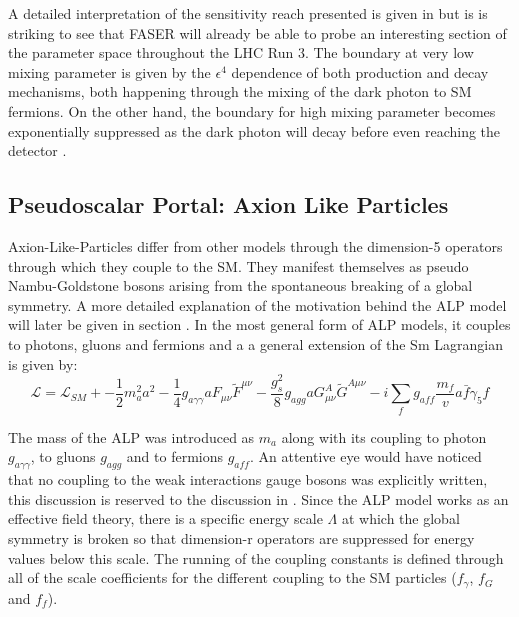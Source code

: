 		A detailed interpretation of the sensitivity reach presented is given in \cite{FASER_LLP} but is is striking to see that FASER will already be able to probe an interesting section of the parameter space throughout the LHC Run 3. The boundary at very low mixing parameter is given by the $\epsilon^4$ dependence of both production and decay mechanisms, both happening through the mixing of the dark photon to SM fermions. On the other hand, the boundary for high mixing parameter becomes exponentially suppressed as the dark photon will decay before even reaching the detector \cite{FASER_LLP}.  
		
		
		\subsection{Pseudoscalar Portal: Axion Like Particles}
		
		Axion-Like-Particles differ from other models through the dimension-5 operators through which they couple to the SM. They manifest themselves as pseudo Nambu-Goldstone bosons arising from the spontaneous breaking of a global symmetry. A more detailed explanation of the motivation behind the ALP model will later be given in section . In the most general form of ALP models, it couples to photons, gluons and fermions and a a general extension of the Sm Lagrangian is given by: 
		\begin{equation}
			\mathcal{L} = \mathcal{L}_{SM} + -\frac{1}{2} m_a^2 a^2 - \frac{1}{4} g_{a\gamma\gamma} a F_{\mu\nu} \tilde{F}^{\mu\nu} - \frac{g_s^2}{8} g_{agg} a G_{\mu\nu}^A \tilde{G}^{A\mu\nu} - i \sum_f g_{aff} \frac{m_f}{v} a \bar{f} \gamma_5 f
		\end{equation}
		
		The mass of the ALP was introduced as $m_a$ along with its coupling to photon $g_{a\gamma\gamma}$, to gluons $g_{agg}$ and to fermions $g_{aff}$. An attentive eye would have noticed that no coupling to the weak interactions gauge bosons was explicitly written, this discussion is reserved to the discussion in . Since the ALP model works as an effective field theory, there is a specific energy scale $\Lambda$ at which the global symmetry is broken so that dimension-r operators are suppressed for energy values below this scale. The running of the coupling constants is defined through all of the scale coefficients for the different coupling to the SM particles ($f_\gamma$, $f_G$ and $f_f$). 
		
